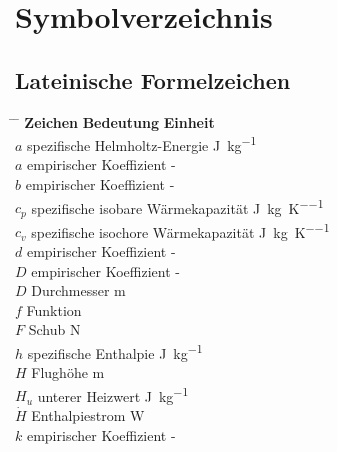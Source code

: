 \chapter*{Symbolverzeichnis}

\section*{Lateinische Formelzeichen}

\begin{tabbing}
	\hspace*{3cm} \= \hspace*{8cm} \= \hspace*{2cm}\kill
	\textbf{Zeichen} \> \textbf{Bedeutung} 				\>	\textbf{Einheit}		\\[5mm]
	$a$         \>  spezifische Helmholtz-Energie       \> \si{\J\per\kg}	 \\
    $a$         \>  empirischer Koeffizient             \>  -  \\
    $b$         \>  empirischer Koeffizient             \>  -  \\
    $c_p$       \>  spezifische isobare Wärmekapazität  \>  \si{\J\per\kg\per\K}	 \\
    $c_v$       \>  spezifische isochore Wärmekapazität \>  \si{\J\per\kg\per\K} \\
    $d$         \>  empirischer Koeffizient             \>  -  \\
    $D$         \>  empirischer Koeffizient             \>  -  \\
    $D$         \>  Durchmesser                         \>  \si{\m}  \\
    $f$         \>  Funktion                            \>   \\
    $F$         \>  Schub                               \>  \si{\N}  \\
    $h$         \>  spezifische Enthalpie               \>  \si{\J\per\kg} \\
    $H$         \>  Flughöhe                            \>  \si{\m} \\
    $H_u$       \>  unterer Heizwert                    \>  \si{\J\per\kg} \\
    $\dot{H}$   \>  Enthalpiestrom                      \>  \si{\W}   \\
    $k$         \>  empirischer Koeffizient             \>  -   \\

\end{tabbing}
